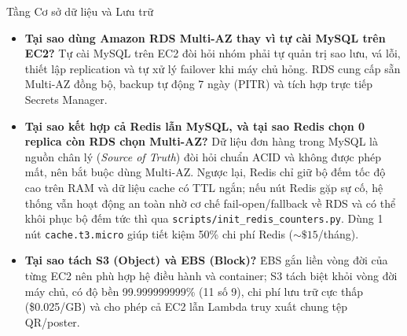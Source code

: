 
\begin{clo2box}{Tầng Cơ sở dữ liệu và Lưu trữ}
  \begin{itemize}[leftmargin=1.3em]
    \item \textbf{Tại sao dùng Amazon RDS Multi-AZ thay vì tự cài MySQL trên EC2?} Tự cài MySQL trên EC2 đòi hỏi nhóm phải tự quản trị sao lưu, vá lỗi, thiết lập replication và tự xử lý failover khi máy chủ hỏng. RDS cung cấp sẵn Multi-AZ đồng bộ, backup tự động 7 ngày (PITR) và tích hợp trực tiếp Secrets Manager.
    \item \textbf{Tại sao kết hợp cả Redis lẫn MySQL, và tại sao Redis chọn 0 replica còn RDS chọn Multi-AZ?} Dữ liệu đơn hàng trong MySQL là nguồn chân lý (\textit{Source of Truth}) đòi hỏi chuẩn ACID và không được phép mất, nên bắt buộc dùng Multi-AZ. Ngược lại, Redis chỉ giữ bộ đếm tốc độ cao trên RAM và dữ liệu cache có TTL ngắn; nếu nút Redis gặp sự cố, hệ thống vẫn hoạt động an toàn nhờ cơ chế fail-open/fallback về RDS và có thể khôi phục bộ đếm tức thì qua \texttt{scripts/init\_redis\_counters.py}. Dùng 1 nút \texttt{cache.t3.micro} giúp tiết kiệm 50\% chi phí Redis ($\sim\$15$/tháng).
    \item \textbf{Tại sao tách S3 (Object) và EBS (Block)?} EBS gắn liền vòng đời của từng EC2 nên phù hợp hệ điều hành và container; S3 tách biệt khỏi vòng đời máy chủ, có độ bền 99.999999999\% (11 số 9), chi phí lưu trữ cực thấp (\$0.025/GB) và cho phép cả EC2 lẫn Lambda truy xuất chung tệp QR/poster.
  \end{itemize}
\end{clo2box}

